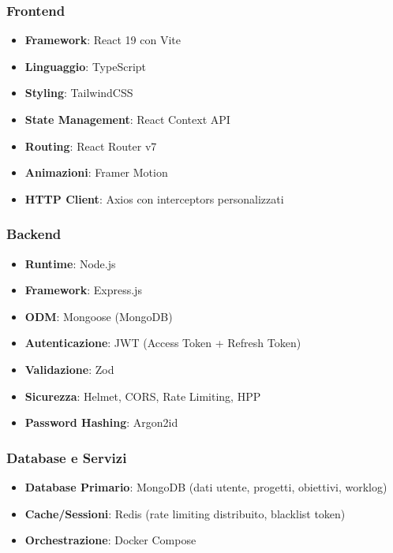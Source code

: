 \documentclass[11pt,a4paper]{article}
\begin{document}
\subsubsection{Frontend}
\begin{itemize}
    \item \textbf{Framework}: React 19 con Vite
    \item \textbf{Linguaggio}: TypeScript
    \item \textbf{Styling}: TailwindCSS
    \item \textbf{State Management}: React Context API
    \item \textbf{Routing}: React Router v7
    \item \textbf{Animazioni}: Framer Motion
    \item \textbf{HTTP Client}: Axios con interceptors personalizzati
\end{itemize}

\subsubsection{Backend}
\begin{itemize}
    \item \textbf{Runtime}: Node.js
    \item \textbf{Framework}: Express.js
    \item \textbf{ODM}: Mongoose (MongoDB)
    \item \textbf{Autenticazione}: JWT (Access Token + Refresh Token)
    \item \textbf{Validazione}: Zod
    \item \textbf{Sicurezza}: Helmet, CORS, Rate Limiting, HPP
    \item \textbf{Password Hashing}: Argon2id
\end{itemize}

\subsubsection{Database e Servizi}
\begin{itemize}
    \item \textbf{Database Primario}: MongoDB (dati utente, progetti, obiettivi, worklog)
    \item \textbf{Cache/Sessioni}: Redis (rate limiting distribuito, blacklist token)
    \item \textbf{Orchestrazione}: Docker Compose
\end{itemize}
\end{document}

